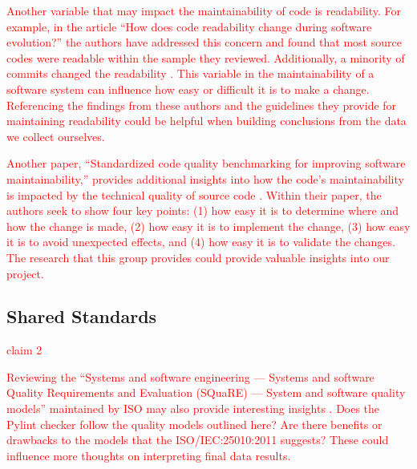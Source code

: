 \documentclass[12pt,conference]{IEEEtran}
\newcommand\todo[1]{\textcolor{red}{#1}}
\begin{document}
\todo{Another variable that may impact the maintainability of code is readability. For example, in the article ``How does code readability change during software evolution?'' the authors have addressed this concern and found that most source codes were readable within the sample they reviewed. Additionally, a minority of commits changed the readability \cite{piantadosi:2020}. This variable in the maintainability of a software system can influence how easy or difficult it is to make a change. Referencing the findings from these authors and the guidelines they provide for maintaining readability could be helpful when building conclusions from the data we collect ourselves.}

\todo{Another paper, ``Standardized code quality benchmarking for improving software maintainability,'' provides additional insights into how the code's maintainability is impacted by the technical quality of source code \cite{baggen:2012}. Within their paper, the authors seek to show four key points: (1) how easy it is to determine where and how the change is made, (2) how easy it is to implement the change, (3) how easy it is to avoid unexpected effects, and (4) how easy it is to validate the changes. The research that this group provides could provide valuable insights into our project.}

\subsection{Shared Standards} \label{sectionSharedStandards}


\todo{claim 2}

\todo{Reviewing the ``Systems and software engineering — Systems and software Quality Requirements and Evaluation (SQuaRE) — System and software quality models'' maintained by ISO may also provide interesting insights \cite{iso/iec:25010:2011}. Does the Pylint checker follow the quality models outlined here? Are there benefits or drawbacks to the models that the ISO/IEC:25010:2011 suggests? These could influence more thoughts on interpreting final data results.}
\end{document}
